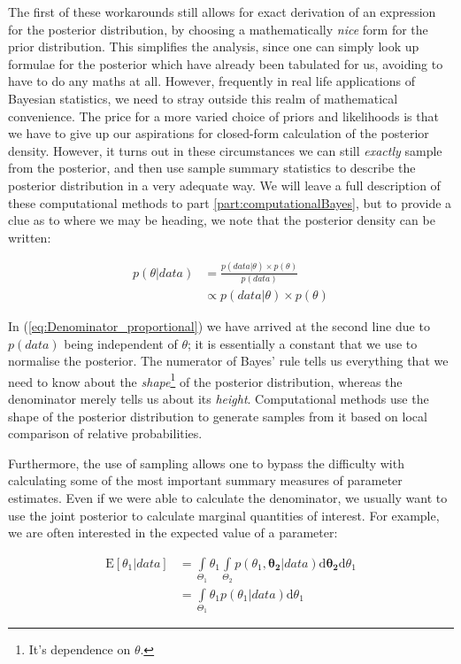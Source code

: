 \documentclass[11pt,fullpage]{book}
\begin{document}
The first of these workarounds still allows for exact derivation of an expression for the posterior distribution, by choosing a mathematically \textit{nice} form for the prior distribution. This simplifies the analysis, since one can simply look up formulae for the posterior which have already been tabulated for us, avoiding to have to do any maths at all. However, frequently in real life applications of Bayesian statistics, we need to stray outside this realm of mathematical convenience. The price for a more varied choice of priors and likelihoods is that we have to give up our aspirations for closed-form calculation of the posterior density. However, it turns out in these circumstances we can still \textit{exactly} sample from the posterior, and then use sample summary statistics to describe the posterior distribution in a very adequate way. We will leave a full description of these computational methods to part \ref{part:computationalBayes}, but to provide a clue as to where we may be heading, we note that the posterior density can be written:

\begin{equation}\label{eq:Denominator_proportional}
\begin{align}
p(\theta|data) &= \frac{p(data|\theta)\times p(\theta)}{p(data)}\\
&\propto p(data|\theta)\times p(\theta)
\end{align}
\end{equation}

In (\ref{eq:Denominator_proportional}) we have arrived at the second line due to $p(data)$ being independent of $\theta$; it is essentially a constant that we use to normalise the posterior. The numerator of Bayes' rule tells us everything that we need to know about the \textit{shape}\footnote{It's dependence on $\theta$.} of the posterior distribution, whereas the denominator merely tells us about its \textit{height}. Computational methods use the shape of the posterior distribution to generate samples from it based on local comparison of relative probabilities. 

Furthermore, the use of sampling allows one to bypass the difficulty with calculating some of the most important summary measures of parameter estimates. Even if we were able to calculate the denominator, we usually want to use the joint posterior to calculate marginal quantities of interest. For example, we are often interested in the expected value of a parameter:

\begin{equation}
\begin{align}
\mathrm{E}[\theta_1|data] &= \int\limits_{\Theta_1} \theta_1\int\limits_{\Theta_2} p(\theta_1,\boldsymbol{\theta_2}|data)\mathrm{d}\boldsymbol{\theta_2} \mathrm{d}\theta_1\\
&= \int\limits_{\Theta_1} \theta_1 p(\theta_1|data) \mathrm{d}\theta_1
\end{align}
\end{equation}
\end{document}

